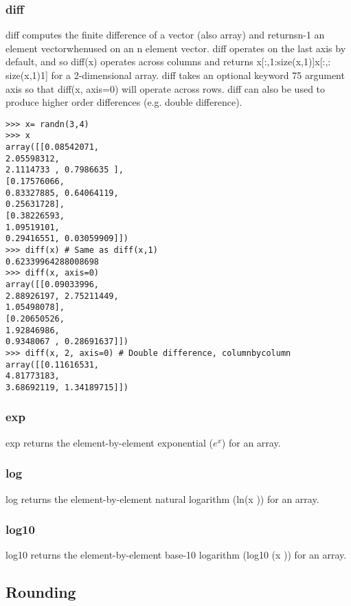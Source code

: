 \documentclass[KSmain.tex]{subfiles}
\begin{document}
\subsubsection*{diff}
diff computes the finite difference of a vector (also array) and returnsn-1 an element vectorwhenused on
an n element vector. diff operates on the last axis by default, and so diff(x) operates across columns and
returns x[:,1:size(x,1)]x[:,:
size(x,1)1]
for a 2-dimensional array. diff takes an optional keyword
75
argument axis so that diff(x, axis=0) will operate across rows. diff can also be used to produce higher
order differences (e.g. double difference).
\begin{framed}
\begin{verbatim}>>> x= randn(3,4)
>>> x
array([[0.08542071,
2.05598312,
2.1114733 , 0.7986635 ],
[0.17576066,
0.83327885, 0.64064119,
0.25631728],
[0.38226593,
1.09519101,
0.29416551, 0.03059909]])
>>> diff(x) # Same as diff(x,1)
0.62339964288008698
>>> diff(x, axis=0)
array([[0.09033996,
2.88926197, 2.75211449,
1.05498078],
[0.20650526,
1.92846986,
0.9348067 , 0.28691637]])
>>> diff(x, 2, axis=0) # Double difference, columnbycolumn
array([[0.11616531,
4.81773183,
3.68692119, 1.34189715]])
\end{verbatim}
\end{framed}
\subsubsection*{exp}
exp returns the element-by-element exponential ($e^x$) for an array.
\subsubsection*{log}
log returns the element-by-element natural logarithm (ln(x )) for an array.
\subsubsection*{log10}
log10 returns the element-by-element base-10 logarithm (log10 (x )) for an array.

\subsection{Rounding}
\end{document}
